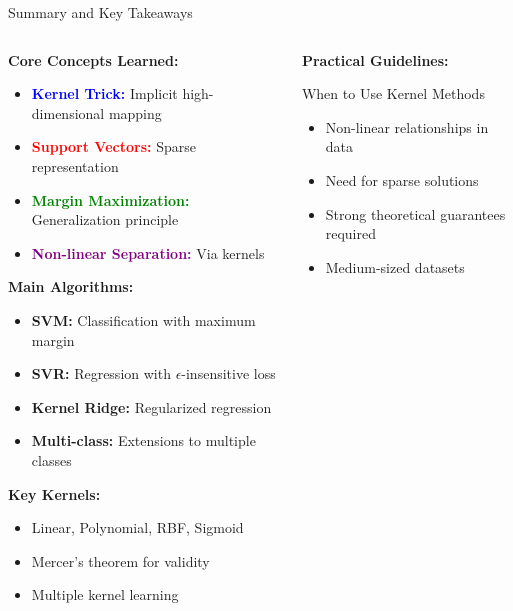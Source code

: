 \documentclass[8pt,aspectratio=1610]{beamer}
\begin{document}
\begin{frame}{Summary and Key Takeaways}
\begin{columns}[t]
\begin{column}{0.48\textwidth}
\textbf{Core Concepts Learned:}
\vspace{0.2cm}

\begin{itemize}
\setlength{\itemsep}{1pt}
\item \textcolor{blue}{\textbf{Kernel Trick:}} Implicit high-dimensional mapping
\item \textcolor{red}{\textbf{Support Vectors:}} Sparse representation
\item \textcolor{green}{\textbf{Margin Maximization:}} Generalization principle
\item \textcolor{purple}{\textbf{Non-linear Separation:}} Via kernels
\end{itemize}

\vspace{0.3cm}
\textbf{Main Algorithms:}
\begin{itemize}
\setlength{\itemsep}{1pt}
\item \textbf{SVM:} Classification with maximum margin
\item \textbf{SVR:} Regression with $\epsilon$-insensitive loss
\item \textbf{Kernel Ridge:} Regularized regression
\item \textbf{Multi-class:} Extensions to multiple classes
\end{itemize}

\vspace{0.3cm}
\textbf{Key Kernels:}
\begin{itemize}
\setlength{\itemsep}{1pt}
\item Linear, Polynomial, RBF, Sigmoid
\item Mercer's theorem for validity
\item Multiple kernel learning
\end{itemize}
\end{column}

\begin{column}{0.48\textwidth}
\textbf{Practical Guidelines:}
\vspace{0.2cm}

\begin{block}{When to Use Kernel Methods}
\begin{itemize}
\setlength{\itemsep}{1pt}
\item Non-linear relationships in data
\item Need for sparse solutions
\item Strong theoretical guarantees required
\item Medium-sized datasets
\end{itemize}
\end{block}


\end{column}
\end{columns}
\end{frame}
\end{document}
